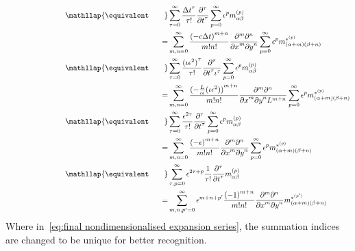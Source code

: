 \begin{align}
  \phantom{\equivalent\qquad}
  &\begin{aligned}
  \nonumber
    \mathllap{\equivalent\qquad} & \sum_{\tau = 0}^\infty \frac{{\Delta t}^\tau }{\tau!}  \frac{\partial^\tau}{{\partial t}^\tau} \sum_{p=0}^{\infty} \epsilon^p m_{\alpha\beta}^{(p)} \\
    = &{}\sum_{m,n = 0}^\infty \frac{{(-c\Delta t)}^{m+n}} {m!n!} \frac{\partial^m \partial^n}{ {\partial x}^m{\partial y}^n} \sum_{p=0}^{\infty} \epsilon^p m_{(\alpha + m)(\beta + n)}^{*^{(p)}}
  \end{aligned}\\
  &\begin{aligned}
    \label{eq:nondimensionalised expansion series}
    \mathllap{\equivalent\qquad} &
    \sum_{\tau = 0}^\infty \frac{{(\iota\epsilon^2)}^\tau }{\tau!} \frac{\partial^\tau}{{\partial t}^\tau \iota^\tau} \sum_{p=0}^{\infty} \epsilon^p m_{\alpha\beta}^{(p)} \\
    = &{}\sum_{m,n = 0}^\infty \frac{{(-\frac{L}{\iota\epsilon}(\iota\epsilon^2))}^{m+n}} {m!n!}
    \frac{\partial^m \partial^n}{ {\partial x}^m{\partial y}^n L^{m+n}} \sum_{p=0}^{\infty} \epsilon^p m_{(\alpha + m)(\beta + n)}^{*^{(p)}}
  \end{aligned} \\
  &\begin{aligned}
  \nonumber
    \mathllap{\equivalent\qquad} &
    \sum_{\tau = 0}^\infty \frac{\epsilon^{2\tau} }{\tau!} \frac{\partial^\tau}{{\partial t}^\tau} \sum_{p=0}^{\infty} \epsilon^p m_{\alpha\beta}^{(p)} \\
    = &{}\sum_{m,n = 0}^\infty \frac{{(-\epsilon)}^{m+n}} {m!n!}
    \frac{\partial^m \partial^n}{ {\partial x}^m{\partial y}^n } \sum_{p=0}^{\infty} \epsilon^p m_{(\alpha + m)(\beta + n)}^{*^{(p)}}
  \end{aligned} \\
  &\begin{aligned}
    \label{eq:final nondimensionalised expansion series}
    \mathllap{\equivalent\qquad} &
    \sum_{\tau, p = 0}^\infty\epsilon^{2\tau + p} \frac{1} {\tau!} \frac{\partial^\tau}{{\partial t}^\tau} m_{\alpha\beta}^{(p)} \\
    = &{} \sum_{m,n,p' = 0}^\infty  \epsilon^{m+n+p'} \frac{{(-1)}^{m+n}} {m!n!}
    \frac{\partial^m \partial^n}{ {\partial x}^m{\partial y}^n } m_{(\alpha + m)(\beta + n)}^{*^{(p')}}
  \end{aligned}
\end{align}
Where in~\eqref{eq:final nondimensionalised expansion series}, the summation indices are changed to be unique for better recognition.

